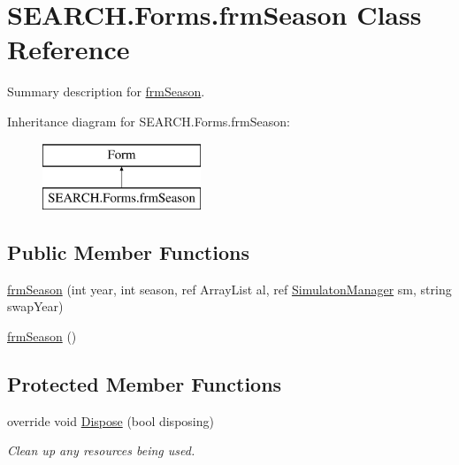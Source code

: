 \hypertarget{class_s_e_a_r_c_h_1_1_forms_1_1frm_season}{\section{S\-E\-A\-R\-C\-H.\-Forms.\-frm\-Season Class Reference}
\label{class_s_e_a_r_c_h_1_1_forms_1_1frm_season}
}


Summary description for \hyperlink{class_s_e_a_r_c_h_1_1_forms_1_1frm_season}{frm\-Season}.  


Inheritance diagram for S\-E\-A\-R\-C\-H.\-Forms.\-frm\-Season\-:\begin{figure}[H]
\begin{center}
\leavevmode
\includegraphics[height=2.000000cm]{class_s_e_a_r_c_h_1_1_forms_1_1frm_season}
\end{center}
\end{figure}
\subsection*{Public Member Functions}
\begin{DoxyCompactItemize}
\item 
\hyperlink{class_s_e_a_r_c_h_1_1_forms_1_1frm_season_ab262d60ce72628aeea6bc49a68acd377}{frm\-Season} (int year, int season, ref Array\-List al, ref \hyperlink{class_s_e_a_r_c_h_1_1_simulaton_manager}{Simulaton\-Manager} sm, string swap\-Year)
\item 
\hyperlink{class_s_e_a_r_c_h_1_1_forms_1_1frm_season_a1a93bdfbcecab718a95ef672be83de10}{frm\-Season} ()
\end{DoxyCompactItemize}
\subsection*{Protected Member Functions}
\begin{DoxyCompactItemize}
\item 
override void \hyperlink{class_s_e_a_r_c_h_1_1_forms_1_1frm_season_a0e765ebfef1574248f7f3099e986c850}{Dispose} (bool disposing)
\begin{DoxyCompactList}\small\item\em Clean up any resources being used. \end{DoxyCompactList}\end{DoxyCompactItemize}


